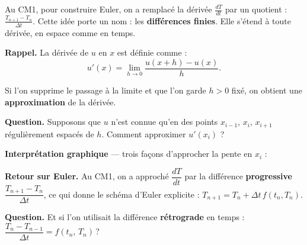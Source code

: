 Au CM1, pour construire Euler, on a remplacé
la dérivée $\frac{dT}{dt}$ par un quotient :
$\frac{T_{n+1}-T_n}{\Delta t}$.
Cette idée porte un nom : les \textbf{différences finies}.
Elle s'étend à toute dérivée, en espace comme en temps.

\medskip

\textbf{Rappel.} La dérivée de $u$ en $x$ est définie comme :
\[
  u'(x) = \lim_{h \to 0} \frac{u(x+h) - u(x)}{h}.
\]

Si l'on supprime le passage à la limite
et que l'on garde $h > 0$ fixé,
on obtient une \textbf{approximation} de la dérivée.

\medskip

\textbf{Question.}
Supposons que $u$ n'est connue qu'en des points
$x_{i-1}$, $x_i$, $x_{i+1}$ régulièrement espacés de $h$.
Comment approximer $u'(x_i)$ ?


\medskip

\textbf{Interprétation graphique}
--- trois façons d'approcher la pente en $x_i$ :

\esquisse[6cm]

\textbf{Retour sur Euler.}
Au CM1, on a approché $\dfrac{dT}{dt}$
par la différence \textbf{progressive}
$\dfrac{T_{n+1} - T_n}{\Delta t}$,
ce qui donne le schéma d'Euler explicite :
$T_{n+1} = T_n + \Delta t\,f(t_n, T_n)$.

\medskip

\textbf{Question.}
Et si l'on utilisait la différence
\textbf{rétrograde} en temps :
$\dfrac{T_n - T_{n-1}}{\Delta t} = f(t_n,\,T_n)$\,?


